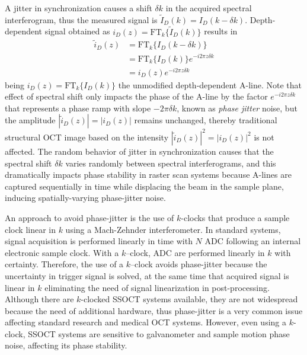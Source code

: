 A jitter in synchronization causes a shift $\delta k$ in the acquired spectral interferogram, thus the measured signal is $\tilde{I}_D(k) = I_D(k-\delta k)$. Depth-dependent signal obtained as $i_D(z)= \text{FT}_k\{\tilde{I}_D(k)\}$ results in
\begin{align} \label{eq:phaseJitter}
    \tilde{i}_D(z) &= \text{FT}_k\{I_D(k-\delta k)\} \nonumber \\
    &=  \text{FT}_k\{I_D(k)\} e^{-i2\pi z\delta k} \nonumber \\
    &=  i_D(z) e^{-i2\pi z\delta k}
\end{align}
being $i_D(z)=\text{FT}_k\{I_D(k)\}$ the unmodified depth-dependent A-line. Note that effect of spectral shift only impacts the phase of the A-line by the factor $e^{-i2\pi z\delta k}$ that represents a phase ramp with slope $-2\pi\delta k$, known as \textit{phase jitter} noise, but the amplitude $|\tilde{i}_D(z)|=|i_D(z)|$ remains unchanged, thereby traditional structural OCT image based on the intensity $|\tilde{i}_D(z)|^2=|i_D(z)|^2$ is not affected. The random behavior of jitter in synchronization causes that the spectral shift $\delta k$ varies randomly between spectral interferograms, and this dramatically impacts phase stability in raster scan systems because A-lines are captured sequentially in time while displacing the beam in the sample plane, inducing spatially-varying phase-jitter noise.

An approach to avoid phase-jitter is the use of $k$-clocks that produce a sample clock linear in $k$ using a Mach-Zehnder interferometer. In standard systems, signal acquisition is performed linearly in time with $N$ ADC following an internal electronic sample clock. With a $k$--clock, ADC are performed linearly in $k$ with certainty. Therefore, the use of a $k$--clock avoids phase-jitter because the uncertainty in trigger signal is solved, at the same time that acquired signal is linear in $k$ eliminating the need of signal linearization in post-processing. Although there are $k$-clocked SSOCT systems available, they are not widespread because the need of additional hardware, thus phase-jitter is a very common issue affecting standard research and medical OCT systems. However, even using a $k$-clock, SSOCT systems are sensitive to galvanometer and sample motion phase noise, affecting its phase stability.

